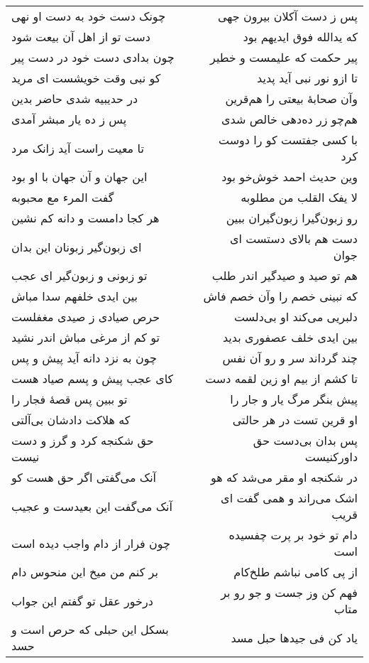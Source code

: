 \begin{center}
\begin{longtable}{l p{0.5cm} r}
\\
چونک دست خود به دست او نهی
&&
پس ز دست آکلان بیرون جهی
\\
دست تو از اهل آن بیعت شود
&&
که یدالله فوق ایدیهم بود
\\
چون بدادی دست خود در دست پیر
&&
پیر حکمت که علیمست و خطیر
\\
کو نبی وقت خویشست ای مرید
&&
تا ازو نور نبی آید پدید
\\
در حدیبیه شدی حاضر بدین
&&
وآن صحابهٔ بیعتی را هم‌قرین
\\
پس ز ده یار مبشر آمدی
&&
هم‌چو زر ده‌دهی خالص شدی
\\
تا معیت راست آید زانک مرد
&&
با کسی جفتست کو را دوست کرد
\\
این جهان و آن جهان با او بود
&&
وین حدیث احمد خوش‌خو بود
\\
گفت المرء مع محبوبه
&&
لا یفک القلب من مطلوبه
\\
هر کجا دامست و دانه کم نشین
&&
رو زبون‌گیرا زبون‌گیران ببین
\\
ای زبون‌گیر زبونان این بدان
&&
دست هم بالای دستست ای جوان
\\
تو زبونی و زبون‌گیر ای عجب
&&
هم تو صید و صیدگیر اندر طلب
\\
بین ایدی خلفهم سدا مباش
&&
که نبینی خصم را وآن خصم فاش
\\
حرص صیادی ز صیدی مغفلست
&&
دلبریی می‌کند او بی‌دلست
\\
تو کم از مرغی مباش اندر نشید
&&
بین ایدی خلف عصفوری بدید
\\
چون به نزد دانه آید پیش و پس
&&
چند گرداند سر و رو آن نفس
\\
کای عجب پیش و پسم صیاد هست
&&
تا کشم از بیم او زین لقمه دست
\\
تو ببین پس قصهٔ فجار را
&&
پیش بنگر مرگ یار و جار را
\\
که هلاکت دادشان بی‌آلتی
&&
او قرین تست در هر حالتی
\\
حق شکنجه کرد و گرز و دست نیست
&&
پس بدان بی‌دست حق داورکنیست
\\
آنک می‌گفتی اگر حق هست کو
&&
در شکنجه او مقر می‌شد که هو
\\
آنک می‌گفت این بعیدست و عجیب
&&
اشک می‌راند و همی گفت ای قریب
\\
چون فرار از دام واجب دیده است
&&
دام تو خود بر پرت چفسیده است
\\
بر کنم من میخ این منحوس دام
&&
از پی کامی نباشم طلخ‌کام
\\
درخور عقل تو گفتم این جواب
&&
فهم کن وز جست و جو رو بر متاب
\\
بسکل این حبلی که حرص است و حسد
&&
یاد کن فی جیدها حبل مسد
\\
\end{longtable}
\end{center}
